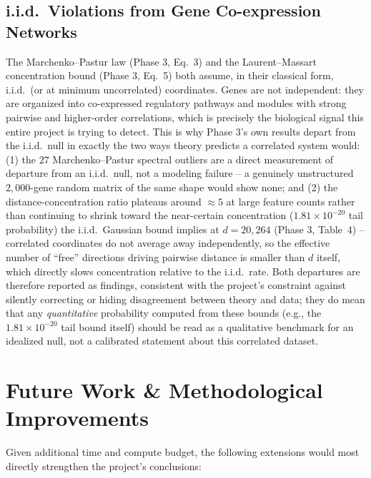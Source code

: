 \documentclass[11pt]{article}
\begin{document}
\subsection{i.i.d.\ Violations from Gene Co-expression Networks}

The Marchenko--Pastur law (Phase 3, Eq.~3) and the Laurent--Massart
concentration bound (Phase 3, Eq.~5) both assume, in their classical form,
i.i.d.\ (or at minimum uncorrelated) coordinates. Genes are not
independent: they are organized into co-expressed regulatory pathways and
modules with strong pairwise and higher-order correlations, which is
precisely the biological signal this entire project is trying to detect.
This is why Phase 3's own results depart from the i.i.d.\ null in exactly
the two ways theory predicts a correlated system would: (1) the $27$
Marchenko--Pastur spectral outliers are a direct measurement of departure
from an i.i.d.\ null, not a modeling failure -- a genuinely unstructured
$2{,}000$-gene random matrix of the same shape would show none; and (2) the
distance-concentration ratio plateaus around $\approx 5$ at large feature
counts rather than continuing to shrink toward the near-certain
concentration ($1.81\times10^{-20}$ tail probability) the i.i.d.\ Gaussian
bound implies at $d=20{,}264$ (Phase 3, Table~4) -- correlated coordinates
do not average away independently, so the effective number of ``free''
directions driving pairwise distance is smaller than $d$ itself, which
directly slows concentration relative to the i.i.d.\ rate. Both departures
are therefore reported as findings, consistent with the project's
constraint against silently correcting or hiding disagreement between
theory and data; they do mean that any \emph{quantitative} probability
computed from these bounds (e.g., the $1.81\times10^{-20}$ tail bound
itself) should be read as a qualitative benchmark for an idealized null,
not a calibrated statement about this correlated dataset.

\section{Future Work \& Methodological Improvements}
\label{sec:future-work}

Given additional time and compute budget, the following extensions would
most directly strengthen the project's conclusions:
\end{document}
